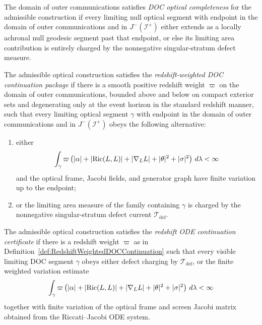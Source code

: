 \begin{definition}\label{def:DOCOpticalCompleteness}
The domain of outer communications satisfies \emph{DOC optical completeness} for the admissible construction if every limiting null optical segment with endpoint in the domain of outer communications and in $J^-(\mathscr I^+)$ either extends as a locally achronal null geodesic segment past that endpoint, or else its limiting area contribution is entirely charged by the nonnegative singular-stratum defect measure.
\end{definition}

\begin{definition}\label{def:RedshiftWeightedDOCContinuation}
The admissible optical construction satisfies the \emph{redshift-weighted DOC continuation package} if there is a smooth positive redshift weight $\varpi$ on the domain of outer communications, bounded above and below on compact exterior sets and degenerating only at the event horizon in the standard redshift manner, such that every limiting optical segment $\gamma$ with endpoint in the domain of outer communications and in $J^-(\mathscr I^+)$ obeys the following alternative:
\begin{enumerate}
    \item either
    \[
        \int_\gamma
        \varpi
        \left(
            |\alpha|
            +
            |\mathrm{Ric}(L,L)|
            +
            |\nabla_L L|
            +
            |\theta|^2
            +
            |\sigma|^2
        \right)\,d\lambda
        <\infty
    \]
    and the optical frame, Jacobi fields, and generator graph have finite variation up to the endpoint;
    \item or the limiting area measure of the family containing $\gamma$ is charged by the nonnegative singular-stratum defect current $\mathcal T_{\mathrm{def}}$.
\end{enumerate}
\end{definition}

\begin{definition}\label{def:RedshiftODEContinuationCertificate}
The admissible optical construction satisfies the \emph{redshift ODE continuation certificate} if there is a redshift weight $\varpi$ as in Definition~\ref{def:RedshiftWeightedDOCContinuation} such that every visible limiting DOC segment $\gamma$ obeys either defect charging by $\mathcal T_{\mathrm{def}}$, or the finite weighted variation estimate
\[
    \int_\gamma
    \varpi
    \left(
        |\alpha|
        +
        |\mathrm{Ric}(L,L)|
        +
        |\nabla_L L|
        +
        |\theta|^2
        +
        |\sigma|^2
    \right)\,d\lambda
    <\infty
\]
together with finite variation of the optical frame and screen Jacobi matrix obtained from the Riccati--Jacobi ODE system.
\end{definition}

